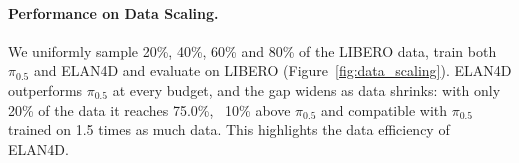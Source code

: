 \paragraph{Performance on Data Scaling.} 
We uniformly sample 20\%, 40\%, 60\% and 80\% of the LIBERO data, train both $\pi_{0.5}$ and ELAN4D and evaluate on LIBERO (Figure~\ref{fig:data_scaling}). 
ELAN4D outperforms $\pi_{0.5}$ at every budget, and the gap widens as 
data shrinks: with only 20\% of the data it reaches 75.0\%, 
~10\% above $\pi_{0.5}$ and compatible with $\pi_{0.5}$ trained on 
1.5 times as much data. This highlights the data efficiency of ELAN4D.\vspace{-1em}
